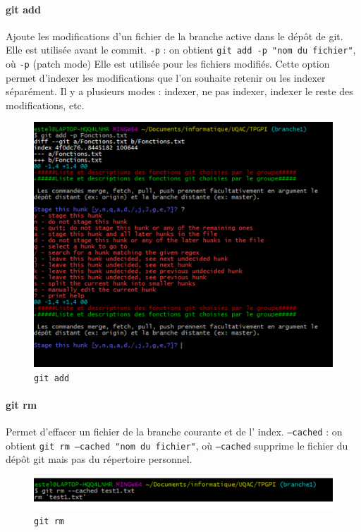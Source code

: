 \documentclass[11pt,canadien]{article}
\begin{document}
\paragraph{git add}Ajoute les modifications d’un fichier de la branche active dans le dépôt de git. Elle est utilisée avant le commit. \texttt{-p} : on obtient \texttt{git add -p "nom du fichier"}, où \texttt{-p} (patch mode) Elle est utilisée pour les fichiers modifiés. Cette option permet d’indexer les modifications que l’on souhaite retenir ou les indexer séparément. Il y a plusieurs modes : indexer, ne pas indexer, indexer le reste des modifications, etc.
\begin{figure}
	\centering
	\includegraphics{images/git_add_-p}
	\caption{\texttt{git add}}
	\label{fig:git_add}
\end{figure}

\paragraph{git rm}Permet d’effacer un fichier de la branche courante et de l’ index. \texttt{--cached} : on obtient \texttt{git rm --cached "nom du fichier"}, où \texttt{--cached} supprime le fichier du dépôt git mais pas du répertoire personnel.
\begin{figure}
	\centering
	\includegraphics{images/git_rm_--cached.png}
	\caption{\texttt{git rm}}
	\label{fig:git_rm}
\end{figure}
\end{document}
